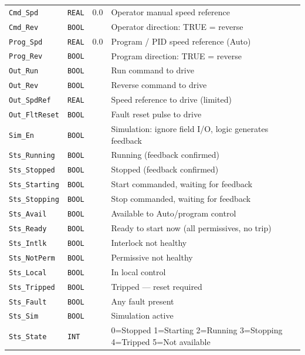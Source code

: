 \begin{small}
\begin{longtable}{@{}P{3.70cm}P{2.20cm}P{1.70cm}P{8.91cm}@{}}
\texttt{Cmd\_Spd} & \texttt{REAL} & 0.0 & Operator manual speed reference \\
\texttt{Cmd\_Rev} & \texttt{BOOL} &  & Operator direction: TRUE = reverse \\
\texttt{Prog\_Spd} & \texttt{REAL} & 0.0 & Program /\allowbreak{} PID speed reference (Auto) \\
\texttt{Prog\_Rev} & \texttt{BOOL} &  & Program direction: TRUE = reverse \\
\texttt{Out\_Run} & \texttt{BOOL} &  & Run command to drive \\
\texttt{Out\_Rev} & \texttt{BOOL} &  & Reverse command to drive \\
\texttt{Out\_SpdRef} & \texttt{REAL} &  & Speed reference to drive (limited) \\
\texttt{Out\_FltReset} & \texttt{BOOL} &  & Fault reset pulse to drive \\
\texttt{Sim\_En} & \texttt{BOOL} &  & Simulation: ignore field I/\allowbreak{}O, logic generates feedback \\
\texttt{Sts\_Running} & \texttt{BOOL} &  & Running (feedback confirmed) \\
\texttt{Sts\_Stopped} & \texttt{BOOL} &  & Stopped (feedback confirmed) \\
\texttt{Sts\_Starting} & \texttt{BOOL} &  & Start commanded, waiting for feedback \\
\texttt{Sts\_Stopping} & \texttt{BOOL} &  & Stop commanded, waiting for feedback \\
\texttt{Sts\_Avail} & \texttt{BOOL} &  & Available to Auto/\allowbreak{}program control \\
\texttt{Sts\_Ready} & \texttt{BOOL} &  & Ready to start now (all permissives, no trip) \\
\texttt{Sts\_Intlk} & \texttt{BOOL} &  & Interlock not healthy \\
\texttt{Sts\_NotPerm} & \texttt{BOOL} &  & Permissive not healthy \\
\texttt{Sts\_Local} & \texttt{BOOL} &  & In local control \\
\texttt{Sts\_Tripped} & \texttt{BOOL} &  & Tripped --- reset required \\
\texttt{Sts\_Fault} & \texttt{BOOL} &  & Any fault present \\
\texttt{Sts\_Sim} & \texttt{BOOL} &  & Simulation active \\
\texttt{Sts\_State} & \texttt{INT} &  & 0=Stopped 1=Starting 2=Running 3=Stopping 4=Tripped 5=Not available \\

\end{longtable}
\end{small}
